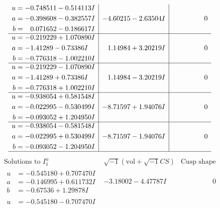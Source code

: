 \documentclass[1p]{elsarticle_modified}
\theoremstyle{definition}
\newcommand{\I}{\sqrt{-1}}
\begin{document}
$$\begin{array}{c|c|c}
\begin{aligned}
u &= -0.748511 - 0.514113 I \\
a &= -0.398608 - 0.382557 I \\
b &= \phantom{-}0.071652 - 0.186617 I\end{aligned}
 & -4.60215 - 2.63504 I & \phantom{-0.000000 } 0 \\ \hline\begin{aligned}
u &= -0.219229 + 1.070890 I \\
a &= -1.41289 - 0.73386 I \\
b &= -0.776318 - 1.002210 I\end{aligned}
 & \phantom{-}1.14984 + 3.20219 I & \phantom{-0.000000 } 0 \\ \hline\begin{aligned}
u &= -0.219229 - 1.070890 I \\
a &= -1.41289 + 0.73386 I \\
b &= -0.776318 + 1.002210 I\end{aligned}
 & \phantom{-}1.14984 - 3.20219 I & \phantom{-0.000000 } 0 \\ \hline\begin{aligned}
u &= -0.938054 + 0.581548 I \\
a &= -0.022995 - 0.530499 I \\
b &= -0.093052 + 1.204950 I\end{aligned}
 & -8.71597 + 1.94076 I & \phantom{-0.000000 } 0 \\ \hline\begin{aligned}
u &= -0.938054 - 0.581548 I \\
a &= -0.022995 + 0.530499 I \\
b &= -0.093052 - 1.204950 I\end{aligned}
 & -8.71597 - 1.94076 I & \phantom{-0.000000 } 0\\
 \hline 
 \end{array}$$\newpage$$\begin{array}{c|c|c}  
\text{Solutions to }I^u_{1}& \I (\text{vol} + \sqrt{-1}CS) & \text{Cusp shape}\\
 \hline 
\begin{aligned}
u &= -0.545180 + 0.707470 I \\
a &= -0.146995 + 0.611732 I \\
b &= -0.67536 + 1.29878 I\end{aligned}
 & -3.18002 - 4.47787 I & \phantom{-0.000000 } 0 \\ \hline\begin{aligned}
u &= -0.545180 - 0.707470 I \\

\end{aligned}
\end{array}$$
\end{document}
